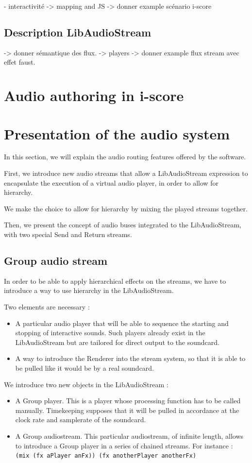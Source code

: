 \documentclass{article}
\begin{document}
- interactivité
-> mapping and JS
-> donner example scénario i-score


\subsection{Description LibAudioStream}
-> donner sémantique des flux.
-> players
-> donner example flux stream avec effet faust.
\section{Audio authoring in i-score}

\section{Presentation of the audio system}
In this section, we will explain the audio routing 
features offered by the software.

First, we introduce new audio streams that allow a LibAudioStream
expression to encapsulate the execution of a virtual audio player, 
in order to allow for hierarchy.

We make the choice to allow for hierarchy by mixing the played streams together.

Then, we present the concept of audio buses integrated to the LibAudioStream,
with two special Send and Return streams.

\subsection{Group audio stream}
In order to be able to apply hierarchical effects on the streams, 
we have to introduce a way to use hierarchy in the LibAudioStream.

Two elements are necessary : 
\begin{itemize}
	\item A particular audio player that will be able to sequence the starting and stopping 
	of interactive sounds.
	Such players already exist in the LibAudioStream but are tailored for direct output to
	the soundcard.
	\item A way to introduce the Renderer into the stream system, so that it 
	is able to be pulled like it would be by a real soundcard.
\end{itemize}

We introduce two new objects in the LibAudioStream : 
\begin{itemize}
	\item A Group player. This is a player whose processing function has to be called manually. 
	Timekeeping supposes that it will be pulled in accordance at the clock rate
	and samplerate of the soundcard.
	\item A Group audiostream. This particular audiostream, of infinite length, 
	allows to introduce a Group player in a series of chained streams.
	For instance : \lstinline{(mix (fx aPlayer anFx)) (fx anotherPlayer anotherFx)}
\end{itemize}
\end{document}

